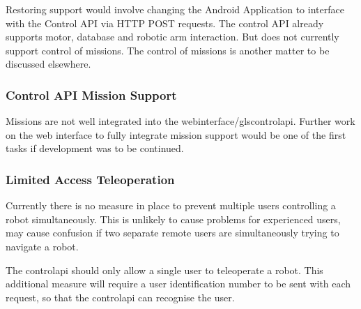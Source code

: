Restoring support would involve changing the Android Application to interface with the Control API via \gls{HTTP} \gls{POST} requests. The control API already supports motor, database and robotic arm interaction. But does not currently support control of missions. The control of missions is another matter to be discussed elsewhere.

\subsubsection{Control API Mission Support}
Missions are not well integrated into the \gls{webinterface}/gls{controlapi}. Further work on the web interface to fully integrate mission support would be one of the first tasks if development was to be continued.

\subsubsection{Limited Access Teleoperation}
\label{sec:web_future_work_access_tele}
Currently there is no measure in place to prevent multiple users controlling a robot simultaneously. This is unlikely to cause problems for experienced users, may cause confusion if two separate remote users are simultaneously trying to navigate a robot.

The \gls{controlapi} should only allow a single user to teleoperate a robot. This additional measure will require a user identification number to be sent with each request, so that the \gls{controlapi} can recognise the user.


